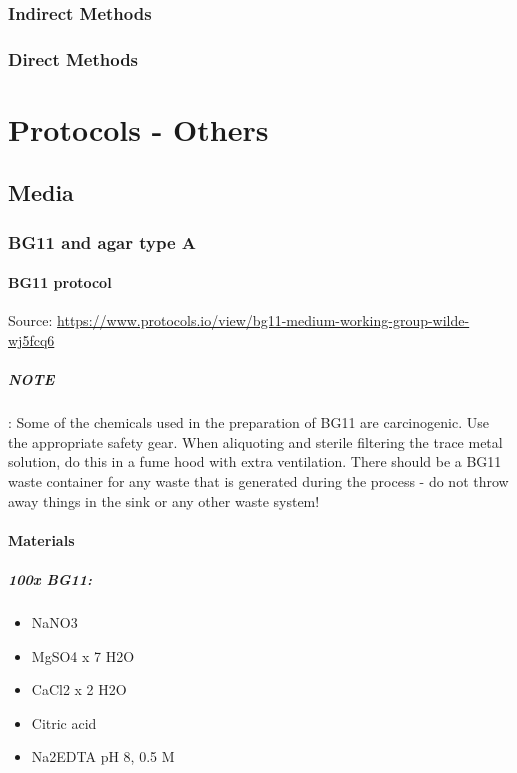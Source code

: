 \subsection{Indirect Methods}
\subsection{Direct Methods}


\chapter{Protocols - Others}
\section{Media}
\subsection{BG11 and agar type A} 
\subsubsection{BG11 protocol}
Source: \href{https://www.protocols.io/view/bg11-medium-working-group-wilde-wj5fcq6}{https://www.protocols.io/view/bg11-medium-working-group-wilde-wj5fcq6}
\paragraph{NOTE}: Some of the chemicals used in the preparation of BG11 are carcinogenic. Use the appropriate safety gear. When aliquoting and sterile filtering the trace metal solution, do this in a fume hood with extra ventilation. There should be a BG11 waste container for any waste that is generated during the process - do not throw away things in the sink or any other waste system!
\subsubsection{Materials}
\paragraph{100x BG11:}
\begin{itemize}
    \item NaNO3
    \item MgSO4 x 7 H2O
    \item CaCl2 x 2 H2O
    \item Citric acid 
    \item Na2EDTA pH 8, 0.5 M
\end{itemize}

